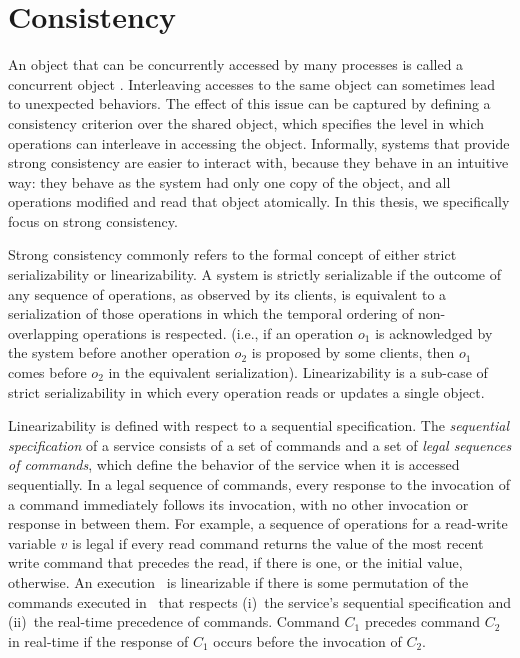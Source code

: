 \section{Consistency}
An object that can be concurrently accessed by many processes is called a
concurrent object \cite{linearizability}. Interleaving accesses to the same
object can sometimes lead to unexpected behaviors. The effect of this issue can
be captured by defining a consistency criterion over the shared object, which
specifies the level in which operations can interleave in accessing the object.
Informally, systems that provide strong consistency are easier to interact with,
because they behave in an intuitive way: they behave as the system had only one
copy of the object, and all operations modified and read that object atomically.
In this thesis, we specifically focus on strong consistency.

Strong consistency commonly refers to the formal concept of either strict
serializability or linearizability\cite{linearizability}. A system is strictly
serializable if the outcome of any sequence of operations, as observed by its
clients, is equivalent to a serialization of those operations in which the
temporal ordering of non-overlapping operations is respected. (i.e., if an
operation \emph{$o_1$} is acknowledged by the system before another operation
\emph{$o_2$} is proposed by some clients, then \emph{$o_1$} comes before
\emph{$o_2$} in the equivalent serialization). Linearizability is a sub-case of
strict serializability in which every operation reads or updates a single
object. 

Linearizability is defined with respect to a sequential
specification. The \emph{sequential specification} of a service consists of a
set of commands and a set of \emph{legal sequences of commands}, which define
the behavior of the service when it is accessed sequentially. In a legal
sequence of commands, every response to the invocation of a command immediately
follows its invocation, with no other invocation or response in between them.
For example, a sequence of operations for a read-write variable $v$ is legal if
every read command returns the value of the most recent write command that
precedes the read, if there is one, or the initial value, otherwise. An
execution \ex\ is linearizable if there is some permutation of the commands
executed in \ex\ that respects (i)~the service's sequential specification and
(ii)~the real-time precedence of commands. Command $C_1$ precedes command $C_2$
in real-time if the response of $C_1$ occurs before the invocation of $C_2$.


